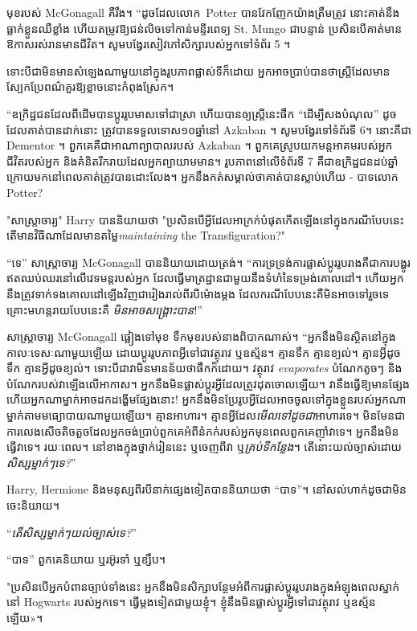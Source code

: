{មុខរបស់ McGonagall គឺរឹង។ “ដូចដែលលោក~Potter បានវែកញែកយ៉ាងត្រឹមត្រូវ នោះគាត់នឹងធ្លាក់ខ្លួនឈឺខ្លាំង ហើយតម្រូវឱ្យជន់លិចទៅកាន់មន្ទីរពេទ្យ St. Mungo ជាបន្ទាន់ ប្រសិនបើគាត់មានឱកាសរស់រានមានជីវិត។ សូមបង្វែរសៀវភៅសិក្សារបស់អ្នកទៅទំព័រ 5 ។

ទោះបីជាមិនមានសំឡេងណាមួយនៅក្នុងរូបភាពផ្លាស់ទីក៏ដោយ អ្នកអាចប្រាប់បានថាស្ត្រីដែលមានស្បែកប្រែពណ៌គួរឱ្យខ្លាចនោះកំពុងស្រែក។

“ឧក្រិដ្ឋជន​ដែល​ពី​ដើម​បាន​ប្តូរ​រូប​មាស​ទៅ​ជា​ស្រា ហើយ​បាន​ឲ្យ​ស្ត្រី​នេះ​ផឹក “ដើម្បី​សង​បំណុល” ដូច​ដែល​គាត់​បាន​ដាក់​នោះ ត្រូវ​បាន​ទទួល​ទោស​១០​ឆ្នាំ​នៅ Azkaban ។ សូមបង្វែរទៅទំព័រទី 6។ នោះគឺជា Dementor ។ ពួកគេគឺជាអាណាព្យាបាលរបស់ Azkaban ។ ពួកគេស្រូបយកមន្តអាគមរបស់អ្នក ជីវិតរបស់អ្នក និងគំនិតរីករាយដែលអ្នកព្យាយាមមាន។ រូបភាពនៅលើទំព័រទី 7 គឺជាឧក្រិដ្ឋជនដប់ឆ្នាំក្រោយមកនៅពេលគាត់ត្រូវបានដោះលែង។ អ្នក​នឹង​កត់​សម្គាល់​ថា​គាត់​បាន​ស្លាប់​ហើយ - បាទ​លោក ~ Potter?

"សាស្រ្តាចារ្យ" Harry បាននិយាយថា "ប្រសិនបើអ្វីដែលអាក្រក់បំផុតកើតឡើងនៅក្នុងករណីបែបនេះ តើមានវិធីណាដែលមានតម្លៃ\emph{maintaining} the Transfiguration?"

“ទេ” សាស្រ្តាចារ្យ McGonagall បាននិយាយដោយត្រង់។ “ការទ្រទ្រង់ការផ្លាស់ប្តូររូបរាងគឺជាការបង្ហូរឥតឈប់ឈរនៅលើវេទមន្តរបស់អ្នក ដែលធ្វើមាត្រដ្ឋានជាមួយនឹងទំហំនៃទម្រង់គោលដៅ។ ហើយអ្នកនឹងត្រូវទាក់ទងគោលដៅឡើងវិញជារៀងរាល់ពីរបីម៉ោងម្តង ដែលករណីបែបនេះគឺមិនអាចទៅរួចទេ គ្រោះមហន្តរាយបែបនេះគឺ \emph{មិនអាចសង្គ្រោះបាន}!”

សាស្រ្តាចារ្យ McGonagall ផ្អៀងទៅមុខ ទឹកមុខរបស់នាងពិបាកណាស់។ “អ្នក​នឹង​មិន​ស្ថិត​នៅ​ក្នុង​កាលៈទេសៈ​ណា​មួយ​ឡើយ​ ដោយ​ប្តូរ​រូប​ភាព​អ្វី​ទៅ​ជា​វត្ថុ​រាវ ឬ​ឧស្ម័ន។ គ្មានទឹក គ្មានខ្យល់។ គ្មានអ្វីដូចទឹក គ្មានអ្វីដូចខ្យល់។ ទោះបីជាវាមិនមានន័យថាផឹកក៏ដោយ។ វត្ថុរាវ \emph{evaporates} បំណែកតូចៗ និងបំណែករបស់វាឡើងលើអាកាស។ អ្នក​នឹង​មិន​ផ្លាស់​ប្តូរ​អ្វី​ដែល​ត្រូវ​ដុត​ចោល​ឡើយ។ វា​នឹង​ធ្វើ​ឱ្យ​មាន​ផ្សែង ហើយ​អ្នក​ណា​ម្នាក់​អាច​ដកដង្ហើម​ផ្សែង​នោះ! អ្នក​នឹង​មិន​ប្រែ​រូប​អ្វី​ដែល​អាច​ចូល​ទៅ​ក្នុង​ខ្លួន​របស់​អ្នក​ណា​ម្នាក់​តាម​មធ្យោបាយ​ណា​មួយ​ឡើយ។ គ្មានអាហារ។ គ្មានអ្វីដែល\emph{មើលទៅដូចជា}អាហារទេ។ មិន​មែន​ជា​ការ​លេងសើច​តិច​តួច​ដែល​អ្នក​ចង់​ប្រាប់​ពួកគេ​អំពី​នំ​ភក់​របស់​អ្នក​មុន​ពេល​ពួកគេ​ញ៉ាំ​វា​ទេ។ អ្នកនឹងមិនធ្វើវាទេ។ រយៈពេល។ នៅខាងក្នុងថ្នាក់រៀននេះ ឬចេញពីវា ឬ\emph{គ្រប់ទីកន្លែង}។ តើនោះយល់ច្បាស់ដោយ\emph{សិស្សម្នាក់ៗទេ?}”

Harry, Hermione និង​មនុស្ស​ពីរ​បី​នាក់​ផ្សេង​ទៀត​បាន​និយាយ​ថា “បាទ”។ នៅសល់ហាក់ដូចជាមិនចេះនិយាយ។

“\emph{តើសិស្សម្នាក់ៗយល់ច្បាស់ទេ?}”

“បាទ” ពួកគេនិយាយ ឬរអ៊ូរទាំ ឬខ្សឹប។

"ប្រសិនបើអ្នកបំពានច្បាប់ទាំងនេះ អ្នកនឹងមិនសិក្សាបន្ថែមអំពីការផ្លាស់ប្តូររូបរាងក្នុងអំឡុងពេលស្នាក់នៅ Hogwarts របស់អ្នកទេ។ ធ្វើម្តងទៀតជាមួយខ្ញុំ។ ខ្ញុំនឹងមិនផ្លាស់ប្តូរអ្វីទៅជាវត្ថុរាវ ឬឧស្ម័នឡើយ»។

}
